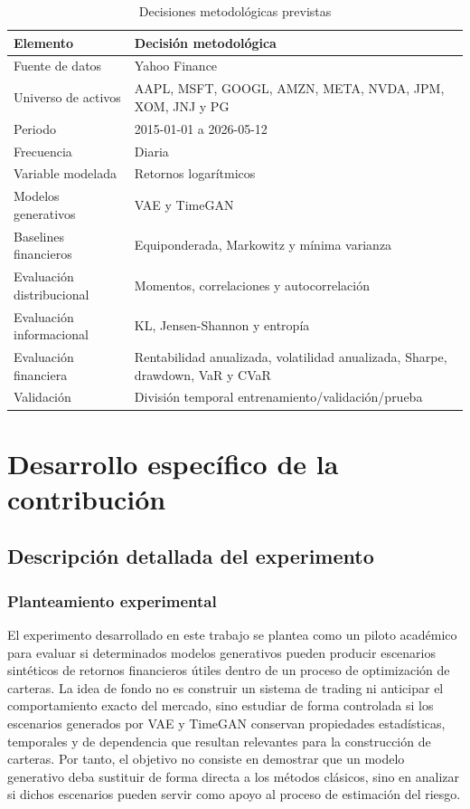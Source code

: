 \documentclass[11pt,a4paper,spanish,oneside]{book}
\numberwithin{equation}{chapter}
\numberwithin{figure}{chapter}
\begin{document}
\begin{table}[H]
\centering
\begin{tabular}{|p{}|p{}|}
\hline
\textbf{Elemento} & \textbf{Decisión metodológica} \\
\hline
Fuente de datos & Yahoo Finance \\
\hline
Universo de activos & AAPL, MSFT, GOOGL, AMZN, META, NVDA, JPM, XOM, JNJ y PG \\
\hline
Periodo & 2015-01-01 a 2026-05-12 \\
\hline
Frecuencia & Diaria \\
\hline
Variable modelada & Retornos logarítmicos \\
\hline
Modelos generativos & VAE y TimeGAN \\
\hline
Baselines financieros & Equiponderada, Markowitz y mínima varianza \\
\hline
Evaluación distribucional & Momentos, correlaciones y autocorrelación \\
\hline
Evaluación informacional & KL, Jensen-Shannon y entropía \\
\hline
Evaluación financiera & Rentabilidad anualizada, volatilidad anualizada, Sharpe, drawdown, VaR y CVaR \\
\hline
Validación & División temporal entrenamiento/validación/prueba \\
\hline
\end{tabular}
\caption{Decisiones metodológicas previstas}\label{tab:decisiones-metodologicas}
\end{table}

\chapter{Desarrollo específico de la contribución}

\section{Descripción detallada del experimento}

\subsection{Planteamiento experimental}

El experimento desarrollado en este trabajo se plantea como un piloto académico para evaluar si determinados modelos generativos pueden producir escenarios sintéticos de retornos financieros útiles dentro de un proceso de optimización de carteras. La idea de fondo no es construir un sistema de trading ni anticipar el comportamiento exacto del mercado, sino estudiar de forma controlada si los escenarios generados por VAE y TimeGAN conservan propiedades estadísticas, temporales y de dependencia que resultan relevantes para la construcción de carteras. Por tanto, el objetivo no consiste en demostrar que un modelo generativo deba sustituir de forma directa a los métodos clásicos, sino en analizar si dichos escenarios pueden servir como apoyo al proceso de estimación del riesgo.
\end{document}
